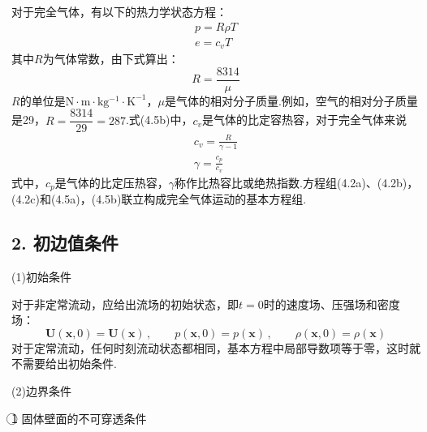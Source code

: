 对于完全气体，有以下的热力学状态方程：
\begin{gather*}
p=R\rho T\tag{4.5a}\\[2pt]
e=c_v T\tag{4.5b}
\end{gather*}
其中$R$为气体常数，由下式算出：
\begin{equation*}
R=\frac{8314}{\mu}
\tag{4.6}
\end{equation*}
$R$的单位是$\mathrm{N\cdot m\cdot kg^{-1}\cdot K^{-1}}$，$\mu$是气体的相对分子质量.例如，空气的相对分子质量是29，$R=\dfrac{8314}{29}=287$.式(4.5b)中，$c_v$是气体的比定容热容，对于完全气体来说
\begin{gather*}
c_v=\frac{R}{\gamma-1}\tag{4.7}\\[2pt]
\gamma=\frac{c_p}{c_v}\tag{4.8}
\end{gather*}
式中，$c_p$是气体的比定压热容，$\gamma$称作比热容比或绝热指数.方程组(4.2a)、(4.2b)，(4.2c)和(4.5a)，(4.5b)联立构成完全气体运动的基本方程组.

\subsection*{2. 初边值条件}

(1)初始条件

对于非定常流动，应给出流场的初始状态，即$t=0$时的速度场、压强场和密度场：
\begin{equation*}
\boldsymbol{U}(\boldsymbol{x},0)=\boldsymbol{U}(\boldsymbol{x})\,,\qquad p(\boldsymbol{x},0)=p(\boldsymbol{x})\,,\qquad \rho(\boldsymbol{x},0)=\rho(\boldsymbol{x})
\tag{4.9}
\end{equation*}
对于定常流动，任何时刻流动状态都相同，基本方程中局部导数项等于零，这时就不需要给出初始条件.

(2)边界条件

\textcircled{1} 固体壁面的不可穿透条件

